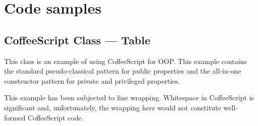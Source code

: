 \chapter{Code samples}

\section{CoffeeScript Class --- Table}

This class is an example of using CoffeeScript for OOP. This example contains the standard pseudo-classical pattern for public properties and the all-in-one constructor pattern for private and privileged properties.

This example has been subjected to line wrapping. Whitespace in Coffee\-Script is significant and, unfortunately, the wrapping here would not constitute well-formed Coffee\-Script code.

